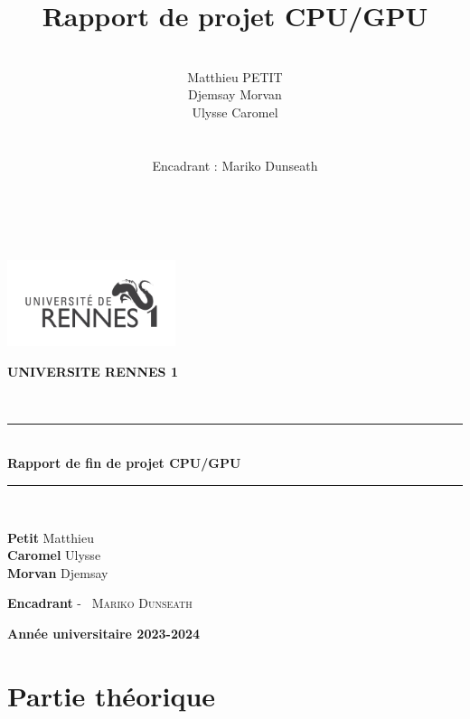 \documentclass[10pt,a4paper]{article}
\title{Rapport de projet CPU/GPU}
\author{\\Matthieu PETIT\\Djemsay Morvan\\Ulysse Caromel\\\\\\
Encadrant : Mariko Dunseath\\\\\\}
\begin{document}



\begin{titlepage}

    \begin{center}
        \begin{center}
            \includegraphics[height=2.5cm]{Images/univ-rennes1.png}
            
        \end{center}
        \begin{center}
            \textbf{UNIVERSITE RENNES 1 }
        \end{center}
        \textsc{\Large }\\[2.5cm]
    \rule{\linewidth}{0.3mm} \\[0.4cm]
    { \huge \bfseries Rapport de fin de projet CPU/GPU \\[0.4cm] }
    \rule{\linewidth}{0.3mm} \\[3cm]
    
    
    \noindent
    \begin{center}
        \textbf{Petit} Matthieu\\
        \textbf{Caromel} Ulysse\\
        \textbf{Morvan} Djemsay\\
    \end{center}
        
    \color{black}
    \centering
    \large \textbf{Encadrant} - ~\textsc{Mariko Dunseath} 
    
    \vfill
    
    {\textbf{\large {Année universitaire} 2023-2024}}
    
    \end{center}
\end{titlepage}

\newpage

\tableofcontents

\newpage

\section{Partie théorique}
\end{document}
